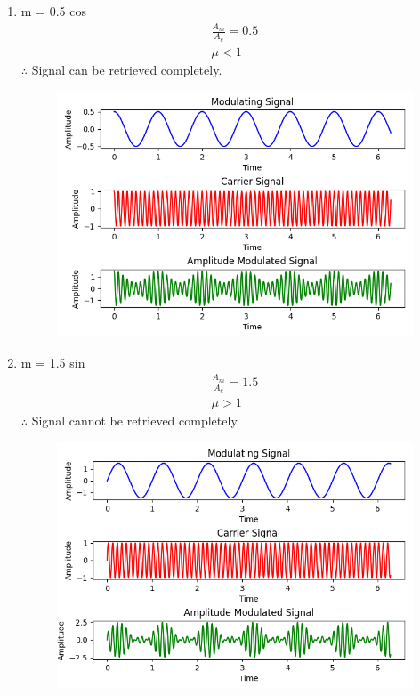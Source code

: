 \documentclass[journal,12pt,twocolumn]{IEEEtran}
\theoremstyle{remark}
\begin{document}
\begin{enumerate}

    \item m = 0.5 cos 
\begin{align}
    \frac{A_m}{A_c}= 0.5 \\
    \mu <1
\end{align}
$\therefore$ Signal can be retrieved completely.
\renewcommand{\thefigure}{\theenumi}
 \renewcommand{\thetable}{\theenumi}
\begin{figure}[h]
  
  \includegraphics[width=\columnwidth]{2022/IN/16/figs/Figure_1.png}
  
\end{figure}
\item m = 1.5 sin 
\begin{align}
    \frac{A_m}{A_c}= 1.5\\
    \mu >1
\end{align}
$\therefore$ Signal cannot be retrieved completely.
\renewcommand{\thefigure}{\theenumi}
 \renewcommand{\thetable}{\theenumi}
\begin{figure}[h]
  
  \includegraphics[width=\columnwidth]{2022/IN/16/figs/Figure_2.png}
  

\end{figure}
\end{enumerate}
\end{document}
